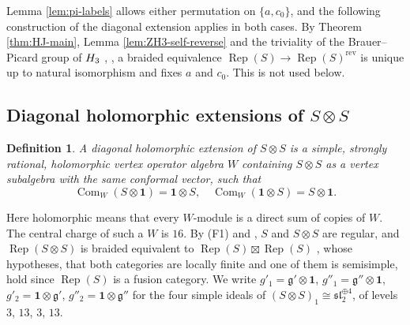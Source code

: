 \documentclass[leqno]{article}
\let\cal\relax
\newcommand{\cal}{\mathcal}
\newcommand{\ot}{\otimes}
\DeclareMathOperator{\Rep}{Rep}
\newtheorem{defi}[thm]{Definition}
\numberwithin{equation}{section}
\begin{document}
Lemma \ref{lem:pi-labels} allows either permutation on $\{a,c_0\}$, and the following construction of the diagonal extension applies in both cases. By Theorem \ref{thm:HJ-main}, Lemma \ref{lem:ZH3-self-reverse} and the triviality of the Brauer--Picard group of $\cal H_3$ \cite[Theorem 1.5 p.~5]{GrS12}, \cite[Theorem 1.1 p.~3]{ENO10}, a braided equivalence $\Rep(S) \to \Rep(S)^{\mathrm{rev}}$ is unique up to natural isomorphism and fixes $a$ and $c_0$. This is not used below.


\subsection{Diagonal holomorphic extensions of \texorpdfstring{$S \ot S$}{S x S}}
\label{subsec:diagonal-extension}

\begin{defi}
\label{def:diagonal-extension}
A \emph{diagonal holomorphic extension} of $S \ot S$ is a simple, strongly rational, holomorphic vertex operator algebra $W$ containing $S \ot S$ as a vertex subalgebra with the same conformal vector, such that
\[
\operatorname{Com}_W(S \ot \mathbf 1) = \mathbf 1 \ot S,
\quad
\operatorname{Com}_W(\mathbf 1 \ot S) = S \ot \mathbf 1.
\]
\end{defi}

Here holomorphic means that every $W$-module is a direct sum of copies of $W$. The central charge of such a $W$ is $16$. By (F1) and \cite[Theorem 4.5]{ABD04}, $S$ and $S \ot S$ are regular, and $\Rep(S \ot S)$ is braided equivalent to $\Rep(S) \boxtimes \Rep(S)$ \cite[Theorem 5.5 p.~48]{CKM22}, whose hypotheses, that both categories are locally finite and one of them is semisimple, hold since $\Rep(S)$ is a fusion category. We write $g'_1 = \mathfrak g' \ot \mathbf 1$, $g''_1 = \mathfrak g'' \ot \mathbf 1$, $g'_2 = \mathbf 1 \ot \mathfrak g'$, $g''_2 = \mathbf 1 \ot \mathfrak g''$ for the four simple ideals of $(S \ot S)_1 \cong \mathfrak{sl}_2^{\oplus 4}$, of levels $3$, $13$, $3$, $13$.
\end{document}
